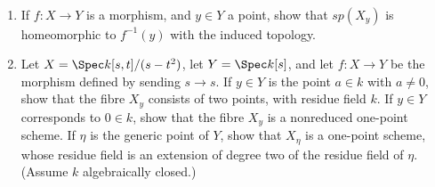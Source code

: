 \begin{exercise}
	~
	\begin{enumerate}
		\item If $f:X \to Y$ is a morphism, and $y \in Y$ a point, show that $sp(X_y)$ is homeomorphic to $f^{-1}(y)$ with the induced topology.
		\item Let $X = \Spec k[s,t]/(s - t^2)$, let $Y = \Spec k[s]$, and let $f:X \to Y$ be the morphism defined by sending $s \to s$. If $y \in Y$ is the point $a \in k$ with $a \ne 0$, show that the fibre $X_y$ consists of two points, with residue field $k$. If $y \in Y$ corresponds to $0 \in k$, show that the fibre $X_y$ is a nonreduced one-point scheme. If $\eta  $ is the generic point of $Y$, show that $X_\eta$ is a one-point scheme, whose residue field is an extension of degree two of the residue field of $\eta  $. (Assume $k$ algebraically closed.)
	\end{enumerate}
\end{exercise}
